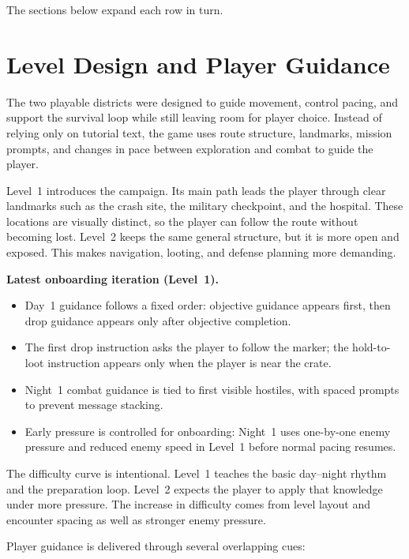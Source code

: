 \documentclass[11pt]{article}
\begin{document}
\noindent The sections below expand each row in turn.

\section{Level Design and Player Guidance}\label{sec:level}

The two playable districts were designed to guide movement, control pacing, and support the survival loop while still leaving room for player choice. Instead of relying only on tutorial text, the game uses route structure, landmarks, mission prompts, and changes in pace between exploration and combat to guide the player.

Level~1 introduces the campaign. Its main path leads the player through clear landmarks such as the crash site, the military checkpoint, and the hospital. These locations are visually distinct, so the player can follow the route without becoming lost. Level~2 keeps the same general structure, but it is more open and exposed. This makes navigation, looting, and defense planning more demanding.

\noindent\textbf{Latest onboarding iteration (Level~1).}
\begin{itemize}
    \item Day~1 guidance follows a fixed order: objective guidance appears first, then drop guidance appears only after objective completion.
    \item The first drop instruction asks the player to follow the marker; the hold-to-loot instruction appears only when the player is near the crate.
    \item Night~1 combat guidance is tied to first visible hostiles, with spaced prompts to prevent message stacking.
    \item Early pressure is controlled for onboarding: Night~1 uses one-by-one enemy pressure and reduced enemy speed in Level~1 before normal pacing resumes.
\end{itemize}

The difficulty curve is intentional. Level~1 teaches the basic day--night rhythm and the preparation loop. Level~2 expects the player to apply that knowledge under more pressure. The increase in difficulty comes from level layout and encounter spacing as well as stronger enemy pressure.

Player guidance is delivered through several overlapping cues:
\end{document}
